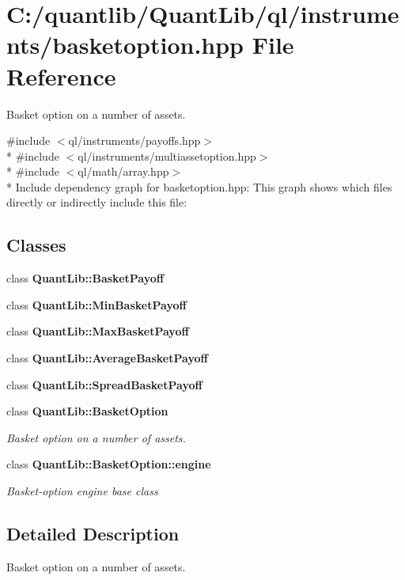 \section{C\+:/quantlib/\+Quant\+Lib/ql/instruments/basketoption.hpp File Reference}
\label{basketoption_8hpp}


Basket option on a number of assets.  


{\ttfamily \#include $<$ql/instruments/payoffs.\+hpp$>$}\\*
{\ttfamily \#include $<$ql/instruments/multiassetoption.\+hpp$>$}\\*
{\ttfamily \#include $<$ql/math/array.\+hpp$>$}\\*
Include dependency graph for basketoption.\+hpp\+:
This graph shows which files directly or indirectly include this file\+:
\subsection*{Classes}
\begin{DoxyCompactItemize}
\item 
class {\bf Quant\+Lib\+::\+Basket\+Payoff}
\item 
class {\bf Quant\+Lib\+::\+Min\+Basket\+Payoff}
\item 
class {\bf Quant\+Lib\+::\+Max\+Basket\+Payoff}
\item 
class {\bf Quant\+Lib\+::\+Average\+Basket\+Payoff}
\item 
class {\bf Quant\+Lib\+::\+Spread\+Basket\+Payoff}
\item 
class {\bf Quant\+Lib\+::\+Basket\+Option}
\begin{DoxyCompactList}\small\item\em Basket option on a number of assets. \end{DoxyCompactList}\item 
class {\bf Quant\+Lib\+::\+Basket\+Option\+::engine}
\begin{DoxyCompactList}\small\item\em Basket-\/option engine base class \end{DoxyCompactList}\end{DoxyCompactItemize}


\subsection{Detailed Description}
Basket option on a number of assets. 

